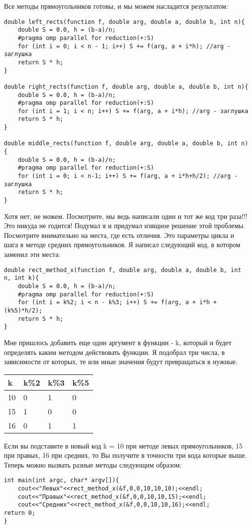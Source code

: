 \documentclass{article}
\begin{document}
Все методы прямоугольников готовы, и мы можем насладится результатом:
\begin{lstlisting}
double left_rects(function f, double arg, double a, double b, int n){
    double S = 0.0, h = (b-a)/n;
    #pragma omp parallel for reduction(+:S)
    for (int i = 0; i < n - 1; i++) S += f(arg, a + i*h); //arg - заглушка
    return S * h;
}

double right_rects(function f, double arg, double a, double b, int n){
    double S = 0.0, h = (b-a)/n;
    #pragma omp parallel for reduction(+:S)
    for (int i = 1; i < n; i++) S += f(arg, a + i*h); //arg - заглушка
    return S * h;
}

double middle_rects(function f, double arg, double a, double b, int n){
    double S = 0.0, h = (b-a)/n;
    #pragma omp parallel for reduction(+:S)
    for (int i = 0; i < n-1; i++) S += f(arg, a + i*h+h/2); //arg - заглушка
    return S * h;
}
\end{lstlisting}

Хотя нет, не можем. Посмотрите, мы ведь написали один и тот же код три раза!!! Это никуда не годится! Подумал я и придумал изящное решение этой проблемы. Посмотрите внимательно на места, где есть отличия. Это параметры цикла и шага в методе средних прямоугольников. Я написал следующий код, в котором заменил эти места:
\begin{lstlisting}
double rect_method_x(function f, double arg, double a, double b, int n, int k){
    double S = 0.0, h = (b-a)/n;
    #pragma omp parallel for reduction(+:S)
    for (int i = k%2; i < n - k%3; i++) S += f(arg, a + i*h + (k%5)*h/2);
    return S * h;
}
\end{lstlisting}
Мне пришлось добавить еще один аргумент в функции - k, который и будет определять каким методом действовать функции. Я подобрал три числа, в зависимости от которых, те или иные значения будут превращаться в нужные.
\begin{table}[h!]
\centering
\begin{tabular}{|l|l|l|l|}
\hline
k  & k\%2 & k\%3 & k\%5 \\ \hline
10 & 0    & 1    & 0    \\ \hline
15 & 1    & 0    & 0    \\ \hline
16 & 0    & 1    & 1    \\ \hline
\end{tabular}
\end{table}
\newline
Если вы подставите в новый код k = 10 при методе левых прямоугольников, 15 при правых, 16 при средних, то Вы получите в точности три кода которые выше.
Теперь можно вызвать разные методы следующим образом:
\begin{lstlisting}
int main(int argc, char* argv[]){
    cout<<"Левых"<<rect_method_x(&f,0,0,10,10,10);<<endl;
    cout<<"Правых"<<rect_method_x(&f,0,0,10,10,15);<<endl;
    cout<<"Средних"<<rect_method_x(&f,0,0,10,10,16);<<endl;
return 0;
}
\end{lstlisting}
\end{document}
